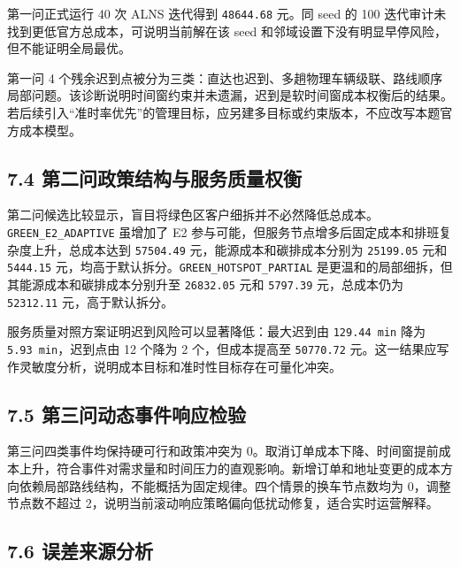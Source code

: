 \documentclass[UTF8,zihao=-4,a4paper]{ctexart}
\begin{document}
第一问正式运行 40 次 ALNS 迭代得到 \texttt{48644.68} 元。同 seed 的 100 迭代审计未找到更低官方总成本，可说明当前解在该 seed 和邻域设置下没有明显早停风险，但不能证明全局最优。

第一问 4 个残余迟到点被分为三类：直达也迟到、多趟物理车辆级联、路线顺序局部问题。该诊断说明时间窗约束并未遗漏，迟到是软时间窗成本权衡后的结果。若后续引入“准时率优先”的管理目标，应另建多目标或约束版本，不应改写本题官方成本模型。

\subsection{7.4 第二问政策结构与服务质量权衡}

第二问候选比较显示，盲目将绿色区客户细拆并不必然降低总成本。\texttt{GREEN\_E2\_ADAPTIVE} 虽增加了 E2 参与可能，但服务节点增多后固定成本和排班复杂度上升，总成本达到 \texttt{57504.49} 元，能源成本和碳排成本分别为 \texttt{25199.05} 元和 \texttt{5444.15} 元，均高于默认拆分。\texttt{GREEN\_HOTSPOT\_PARTIAL} 是更温和的局部细拆，但其能源成本和碳排成本分别升至 \texttt{26832.05} 元和 \texttt{5797.39} 元，总成本仍为 \texttt{52312.11} 元，高于默认拆分。

服务质量对照方案证明迟到风险可以显著降低：最大迟到由 \texttt{129.44 min} 降为 \texttt{5.93 min}，迟到点由 12 个降为 2 个，但成本提高至 \texttt{50770.72} 元。这一结果应写作灵敏度分析，说明成本目标和准时性目标存在可量化冲突。

\subsection{7.5 第三问动态事件响应检验}

第三问四类事件均保持硬可行和政策冲突为 0。取消订单成本下降、时间窗提前成本上升，符合事件对需求量和时间压力的直观影响。新增订单和地址变更的成本方向依赖局部路线结构，不能概括为固定规律。四个情景的换车节点数均为 0，调整节点数不超过 2，说明当前滚动响应策略偏向低扰动修复，适合实时运营解释。

\subsection{7.6 误差来源分析}
\end{document}
